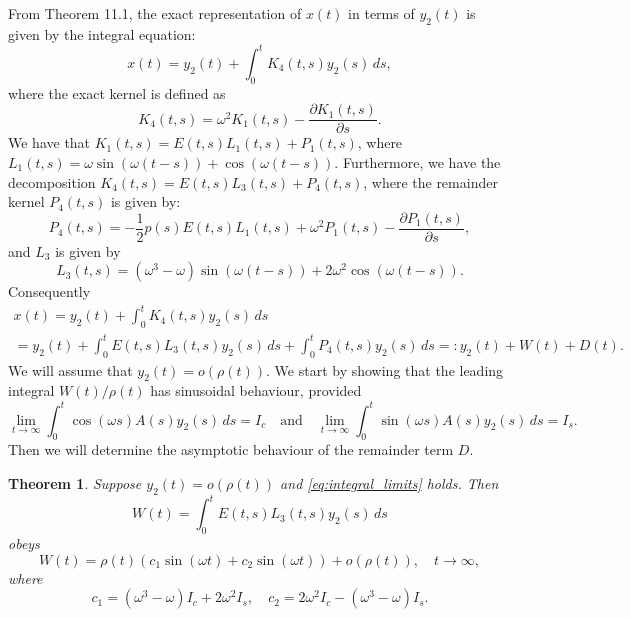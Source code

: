 \documentclass[10pt,reqno]{amsart}
\newtheorem{theorem}{Theorem}
\theoremstyle{definition}
\begin{document}
	From Theorem 11.1, the exact representation of $x(t)$ in terms of $y_2(t)$ is given by the integral equation:
	\[ x(t) = y_2(t) + \int_0^t K_4(t, s) y_2(s) \, ds, \]
	where the exact kernel is defined as $$K_4(t, s) = \omega^2 K_1(t, s) - \frac{\partial K_1(t, s)}{\partial s}.$$ 
	We have that $K_1(t, s) = E(t, s)L_1(t, s) + P_1(t, s)$, where $L_1(t, s) = \omega \sin(\omega(t-s)) + \cos(\omega(t-s))$. Furthermore, we have the decomposition $K_4(t, s) = E(t, s) L_3(t, s) + P_4(t, s)$, where the remainder kernel $P_4(t, s)$ is given by:
	\[ P_4(t, s) = - \frac{1}{2}p(s)E(t, s)L_1(t, s) + \omega^2 P_1(t, s) - \frac{\partial P_1(t, s)}{\partial s},\]
	and $L_3$ is given by 
		\[ L_3(t, s) = (\omega^3 - \omega) \sin(\omega(t-s)) + 2\omega^2 \cos(\omega(t-s)). \]
	Consequently 
	\begin{multline} \label{eq.decompxWDy2}
	 x(t) = y_2(t) + \int_0^t K_4(t, s) y_2(s) \, ds 
	 \\ = y_2(t)+\int_0^t E(t, s) L_3(t, s) y_2(s)\,ds + \int_0^t P_4(t,s)y_2(s)\,ds=: y_2(t)+W(t)+D(t).
	\end{multline}
	We will assume that $y_2(t)=o(\rho(t))$. We start by showing that the leading integral $W(t)/\rho(t)$ has sinusoidal behaviour, provided 
		\begin{equation} \label{eq:integral_limits}
		\lim_{t \to \infty} \int_0^t \cos(\omega s) A(s) y_2(s) \, ds = I_c \quad \text{and} \quad \lim_{t \to \infty} \int_0^t \sin(\omega s) A(s) y_2(s) \, ds = I_s.
	\end{equation}
	Then we will determine the asymptotic behaviour of the remainder term $D$.
	\begin{theorem}
	Suppose $y_2(t)=o(\rho(t))$ and \eqref{eq:integral_limits} holds. Then 
	\[
	W(t)=\int_0^t E(t, s) L_3(t, s) y_2(s)\,ds
	\]
	obeys 
	\[
	W(t)=\rho(t)(c_1 \sin(\omega t) + c_2 \sin(\omega t))+o(\rho(t)), \quad t\to\infty,
	\]
	where 
	\[
	c_1 = (\omega^3 - \omega)I_c + 2\omega^2 I_s, \quad c_2 = 2\omega^2 I_c - (\omega^3 - \omega)I_s.
	\]
	\end{theorem}
\end{document}
